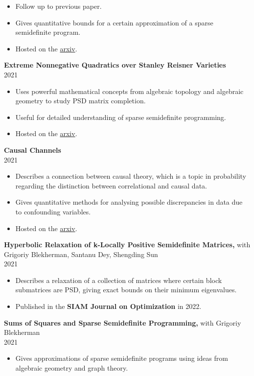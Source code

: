 \documentclass[margin]{res}
\begin{document}
\begin{resume}
\begin{itemize}
\item Follow up to previous paper.
\item Gives quantitative bounds for a certain approximation of a sparse semidefinite program.
\item Hosted on the \href{https://arxiv.org/abs/2107.11436}{arxiv}.
\end{itemize}
{\bf    Extreme Nonnegative Quadratics over Stanley Reisner Varieties} \\ 2021
\begin{itemize} \itemsep -2pt %
\item Uses powerful mathematical concepts from algebraic topology and algebraic geometry to study PSD matrix completion.
\item Useful for detailed understanding of sparse semidefinite programming.
\item Hosted on the \href{https://arxiv.org/abs/2106.13894}{arxiv}.
\end{itemize}
{\bf    Causal Channels} \\ 2021
\begin{itemize} \itemsep -2pt %
\item Describes a connection between causal theory, which is a topic in probability regarding the distinction between correlational and causal data.
\item Gives quantitative methods for analysing possible discrepancies in data due to confounding variables.
\item Hosted on the \href{https://arxiv.org/abs/2103.02834}{arxiv}.
\end{itemize}
{\bf    Hyperbolic Relaxation of k-Locally Positive Semidefinite Matrices,} with Grigoriy Blekherman, Santanu Dey, Shengding Sun\\ 2021
\begin{itemize} \itemsep -2pt %
\item Describes a relaxation of a collection of matrices where certain block submatrices are PSD, giving exact bounds on their minimum eigenvalues.
\item Published in the \textbf{SIAM Journal on Optimization} in 2022.
\end{itemize}
{\bf   Sums of Squares and Sparse Semidefinite Programming,} with Grigoriy Blekherman \\ 2021
\begin{itemize} \itemsep -2pt %
\item Gives approximations of sparse semidefinite programs using ideas from algebraic geometry and graph theory.

\end{itemize}
\end{resume}
\end{document}
